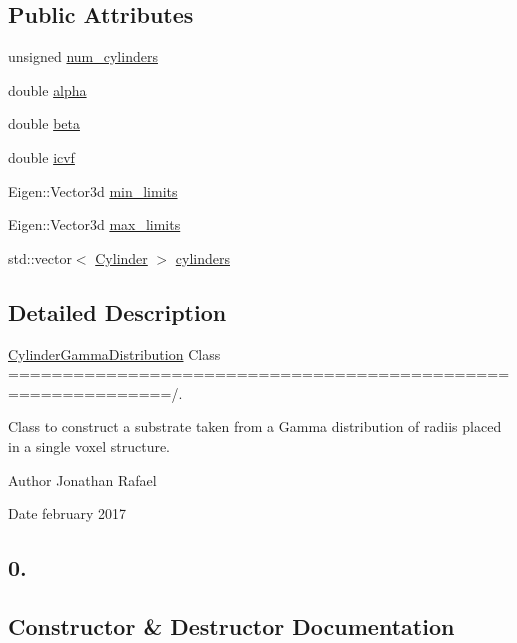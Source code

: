 \subsection*{Public Attributes}
\begin{DoxyCompactItemize}
\item 
unsigned \hyperlink{class_cylinder_gamma_distribution_af74583662a4f33ba1565f2c71e6bbc5a}{num\+\_\+cylinders}
\item 
double \hyperlink{class_cylinder_gamma_distribution_a8cae528f51692ed05049e4ea06c63722}{alpha}
\item 
double \hyperlink{class_cylinder_gamma_distribution_a601a42ef7bacbf9696229efbd703f61e}{beta}
\item 
double \hyperlink{class_cylinder_gamma_distribution_a31f82c4608b7cd2b022805e30a4db983}{icvf}
\item 
Eigen\+::\+Vector3d \hyperlink{class_cylinder_gamma_distribution_ac77a9d794f2f2000066c4a26f19a9097}{min\+\_\+limits}
\item 
Eigen\+::\+Vector3d \hyperlink{class_cylinder_gamma_distribution_aa7094851c2ccf05fc5ff7a99707aa786}{max\+\_\+limits}
\item 
std\+::vector$<$ \hyperlink{class_cylinder}{Cylinder} $>$ \hyperlink{class_cylinder_gamma_distribution_a3e8265a7ddb15d895112e02bd66fbf67}{cylinders}
\end{DoxyCompactItemize}


\subsection{Detailed Description}
\hyperlink{class_cylinder_gamma_distribution}{Cylinder\+Gamma\+Distribution} Class =============================================================/. 

Class to construct a substrate taken from a Gamma distribution of radiis placed in a single voxel structure. \begin{DoxyAuthor}{Author}
Jonathan Rafael 
\end{DoxyAuthor}
\begin{DoxyDate}{Date}
february 2017 \subsection*{0. }
\end{DoxyDate}


\subsection{Constructor \& Destructor Documentation}
\mbox{\label{class_cylinder_gamma_distribution_a63bde146b07919742e432cf16c37e5a1}} 
